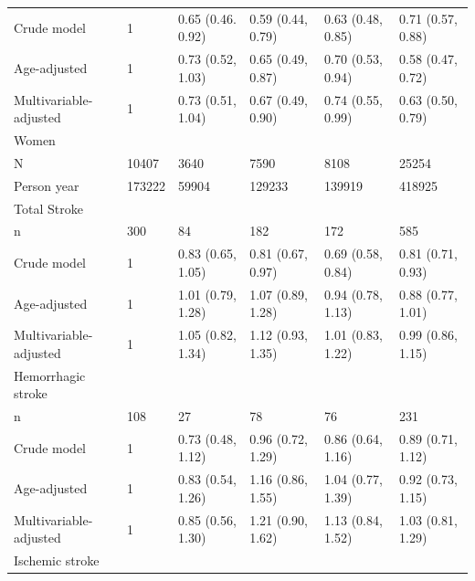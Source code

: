 \documentclass[]{tufte-handout}
\begin{document}
\begin{table}[!htbp]
\begin{tabular}[t]{llllll}
\hspace{1em}Crude model & 1 & 0.65 (0.46. 0.92) & 0.59 (0.44, 0.79) & 0.63 (0.48, 0.85) & 0.71 (0.57, 0.88)\\
\rowcolor{gray!6}  \hspace{1em}Age-adjusted & 1 & 0.73 (0.52, 1.03) & 0.65 (0.49, 0.87) & 0.70 (0.53, 0.94) & 0.58 (0.47, 0.72)\\
\hspace{1em}Multivariable-adjusted & 1 & 0.73 (0.51, 1.04) & 0.67 (0.49, 0.90) & 0.74 (0.55, 0.99) & 0.63 (0.50, 0.79)\\
\rowcolor{gray!6}  Women &  &  &  &  & \\
N & 10407 & 3640 & 7590 & 8108 & 25254\\
\rowcolor{gray!6}  Person year & 173222 & 59904 & 129233 & 139919 & 418925\\
Total Stroke &  &  &  &  & \\
\rowcolor{gray!6}  \hspace{1em}n & 300 & 84 & 182 & 172 & 585\\
\hspace{1em}Crude model & 1 & 0.83 (0.65, 1.05) & 0.81 (0.67, 0.97) & 0.69 (0.58, 0.84) & 0.81 (0.71, 0.93)\\
\rowcolor{gray!6}  \hspace{1em}Age-adjusted & 1 & 1.01 (0.79, 1.28) & 1.07 (0.89, 1.28) & 0.94 (0.78, 1.13) & 0.88 (0.77, 1.01)\\
\hspace{1em}Multivariable-adjusted & 1 & 1.05 (0.82, 1.34) & 1.12 (0.93, 1.35) & 1.01 (0.83, 1.22) & 0.99 (0.86, 1.15)\\
\rowcolor{gray!6}  Hemorrhagic stroke &  &  &  &  & \\
\hspace{1em}n & 108 & 27 & 78 & 76 & 231\\
\rowcolor{gray!6}  \hspace{1em}Crude model & 1 & 0.73 (0.48, 1.12) & 0.96 (0.72, 1.29) & 0.86 (0.64, 1.16) & 0.89 (0.71, 1.12)\\
\hspace{1em}Age-adjusted & 1 & 0.83 (0.54, 1.26) & 1.16 (0.86, 1.55) & 1.04 (0.77, 1.39) & 0.92 (0.73, 1.15)\\
\rowcolor{gray!6}  \hspace{1em}Multivariable-adjusted & 1 & 0.85 (0.56, 1.30) & 1.21 (0.90, 1.62) & 1.13 (0.84, 1.52) & 1.03 (0.81, 1.29)\\
Ischemic stroke &  &  &  &  & \\

\end{tabular}
\end{table}
\end{document}
